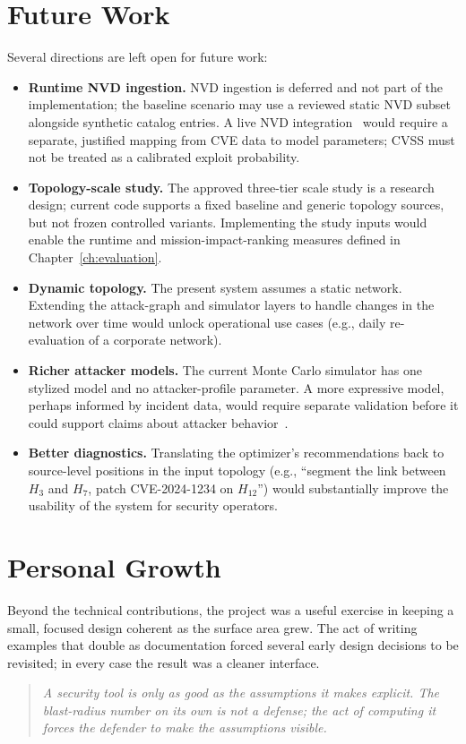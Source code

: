 \section{Future Work}
\label{ch:conclusion:future}

Several directions are left open for future work:

\begin{itemize}
	\item \textbf{Runtime NVD ingestion.} NVD ingestion is deferred and not part of the implementation; the baseline scenario may use a reviewed static NVD subset alongside synthetic catalog entries. A live NVD integration~\cite{nvd} would require a separate, justified mapping from CVE data to model parameters; CVSS must not be treated as a calibrated exploit probability.
	\item \textbf{Topology-scale study.} The approved three-tier scale study is a research design; current code supports a fixed baseline and generic topology sources, but not frozen controlled variants. Implementing the study inputs would enable the runtime and mission-impact-ranking measures defined in Chapter~\ref{ch:evaluation}.
	\item \textbf{Dynamic topology.} The present system assumes a static network. Extending the attack-graph and simulator layers to handle changes in the network over time would unlock operational use cases (e.g., daily re-evaluation of a corporate network).
	\item \textbf{Richer attacker models.} The current Monte Carlo simulator has one stylized model and no attacker-profile parameter. A more expressive model, perhaps informed by incident data, would require separate validation before it could support claims about attacker behavior~\cite{jha02two, ammann02tva}.
	\item \textbf{Better diagnostics.} Translating the optimizer's recommendations back to source-level positions in the input topology (e.g., \enquote{segment the link between $H_3$ and $H_7$, patch CVE-2024-1234 on $H_{12}$}) would substantially improve the usability of the system for security operators.
\end{itemize}

\section{Personal Growth}
\label{ch:conclusion:growth}

Beyond the technical contributions, the project was a useful exercise in keeping a small, focused design coherent as the surface area grew. The act of writing examples that double as documentation forced several early design decisions to be revisited; in every case the result was a cleaner interface.

\begin{quote}
	\itshape A security tool is only as good as the assumptions it makes explicit. The blast-radius number on its own is not a defense; the act of computing it forces the defender to make the assumptions visible.
\end{quote}
